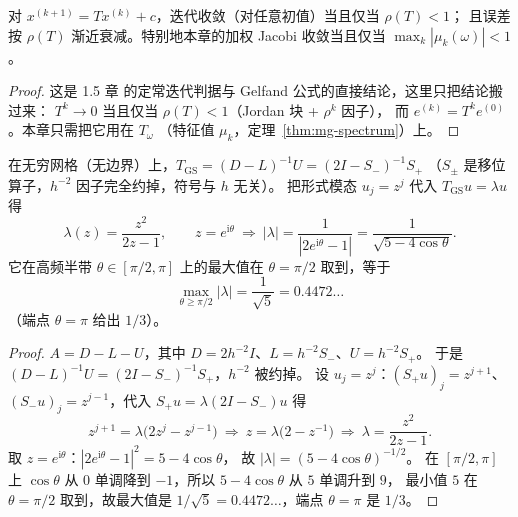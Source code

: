 \begin{lemma}[定常迭代的收敛判据（引自 1.5 章）]
\label{lem:mg-stationary}
对 $x^{(k+1)}=Tx^{(k)}+c$，迭代收敛（对任意初值）当且仅当 $\rho(T)<1$；
且误差按 $\rho(T)$ 渐近衰减。特别地本章的加权 Jacobi 收敛当且仅当
$\max_k|\mu_k(\omega)|<1$。
\end{lemma}

\begin{proof}
这是 1.5 章 的定常迭代判据与 Gelfand 公式的直接结论，这里只把结论搬过来：
$T^k\to0$ 当且仅当 $\rho(T)<1$（Jordan 块 + $\rho^k$ 因子），
而 $e^{(k)}=T^ke^{(0)}$。本章只需把它用在 $T_\omega$
（特征值 $\mu_k$，定理~\ref{thm:mg-spectrum}）上。
\end{proof}

\begin{theorem}
\label{thm:mg-gs-symbol}
在无穷网格（无边界）上，$T_{\mathrm{GS}}=(D-L)^{-1}U=(2I-S_-)^{-1}S_+$
（$S_\pm$ 是移位算子，$h^{-2}$ 因子完全约掉，符号与 $h$ 无关）。
把形式模态 $u_j=z^j$ 代入 $T_{\mathrm{GS}}u=\lambda u$ 得
\begin{equation}
  \lambda(z)=\frac{z^2}{2z-1},
  \qquad
  z=e^{\mathrm i\theta}\ \Rightarrow\
  |\lambda|=\frac{1}{|2e^{\mathrm i\theta}-1|}=\frac{1}{\sqrt{5-4\cos\theta}} .
  \label{eq:mg-gs-symbol}
\end{equation}
它在高频半带 $\theta\in[\pi/2,\pi]$ 上的最大值在 $\theta=\pi/2$ 取到，等于
\begin{equation}
  \max_{\theta\ge\pi/2}|\lambda|=\frac{1}{\sqrt5}=0.4472\ldots
  \label{eq:mg-gs-max}
\end{equation}
（端点 $\theta=\pi$ 给出 $1/3$）。
\end{theorem}

\begin{proof}
$A=D-L-U$，其中 $D=2h^{-2}I$、$L=h^{-2}S_-$、$U=h^{-2}S_+$。
于是 $(D-L)^{-1}U=(2I-S_-)^{-1}S_+$，$h^{-2}$ 被约掉。
设 $u_j=z^j$：$(S_+u)_j=z^{j+1}$、$(S_-u)_j=z^{j-1}$，代入 $S_+u=\lambda(2I-S_-)u$ 得
\begin{equation}
  z^{j+1}=\lambda\bigl(2z^j-z^{j-1}\bigr)
  \ \Longrightarrow\
  z=\lambda\bigl(2-z^{-1}\bigr)
  \ \Longrightarrow\
  \lambda=\frac{z^2}{2z-1}.
\end{equation}
取 $z=e^{\mathrm i\theta}$：$|2e^{\mathrm i\theta}-1|^2=5-4\cos\theta$，
故 $|\lambda|=(5-4\cos\theta)^{-1/2}$。
在 $[\pi/2,\pi]$ 上 $\cos\theta$ 从 $0$ 单调降到 $-1$，所以 $5-4\cos\theta$ 从 $5$ 单调升到 $9$，
最小值 $5$ 在 $\theta=\pi/2$ 取到，故最大值是 $1/\sqrt5=0.4472\ldots$，端点 $\theta=\pi$ 是 $1/3$。
\end{proof}

